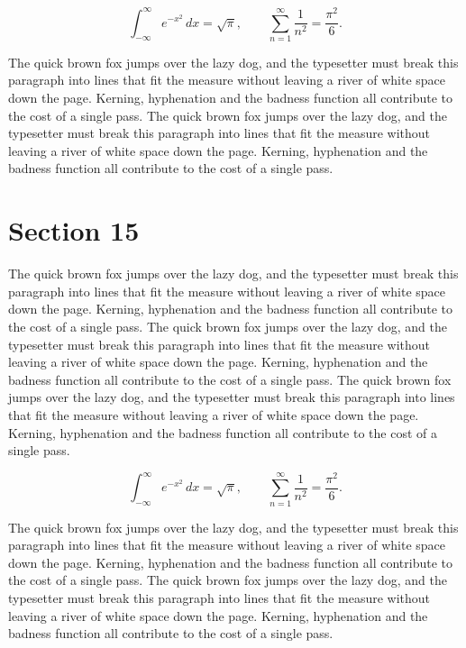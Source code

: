 \documentclass{article}
\begin{document}
\begin{equation}
\int_{-\infty}^{\infty} e^{-x^{2}}\,dx = \sqrt{\pi}, \qquad
\sum_{n=1}^{\infty} \frac{1}{n^{2}} = \frac{\pi^{2}}{6}.
\end{equation}

The quick brown fox jumps over the lazy dog, and the typesetter must break this paragraph into lines that fit the measure without leaving a river of white space down the page. Kerning, hyphenation and the badness function all contribute to the cost of a single pass. The quick brown fox jumps over the lazy dog, and the typesetter must break this paragraph into lines that fit the measure without leaving a river of white space down the page. Kerning, hyphenation and the badness function all contribute to the cost of a single pass. 
\section{Section 15}
The quick brown fox jumps over the lazy dog, and the typesetter must break this paragraph into lines that fit the measure without leaving a river of white space down the page. Kerning, hyphenation and the badness function all contribute to the cost of a single pass. The quick brown fox jumps over the lazy dog, and the typesetter must break this paragraph into lines that fit the measure without leaving a river of white space down the page. Kerning, hyphenation and the badness function all contribute to the cost of a single pass. The quick brown fox jumps over the lazy dog, and the typesetter must break this paragraph into lines that fit the measure without leaving a river of white space down the page. Kerning, hyphenation and the badness function all contribute to the cost of a single pass. 

\begin{equation}
\int_{-\infty}^{\infty} e^{-x^{2}}\,dx = \sqrt{\pi}, \qquad
\sum_{n=1}^{\infty} \frac{1}{n^{2}} = \frac{\pi^{2}}{6}.
\end{equation}

The quick brown fox jumps over the lazy dog, and the typesetter must break this paragraph into lines that fit the measure without leaving a river of white space down the page. Kerning, hyphenation and the badness function all contribute to the cost of a single pass. The quick brown fox jumps over the lazy dog, and the typesetter must break this paragraph into lines that fit the measure without leaving a river of white space down the page. Kerning, hyphenation and the badness function all contribute to the cost of a single pass. 
\end{document}
